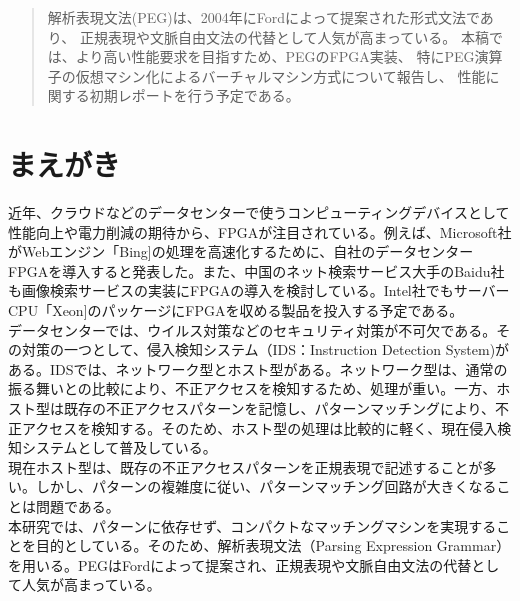\documentclass[paper]{ieicej}
\begin{document}
\begin{abstract}
解析表現文法(PEG)は、2004年にFordによって提案された形式文法であり、
正規表現や文脈自由文法の代替として人気が高まっている。
本稿では、より高い性能要求を目指すため、PEGのFPGA実装、
特にPEG演算子の仮想マシン化によるバーチャルマシン方式について報告し、
性能に関する初期レポートを行う予定である。
\end{abstract}
\begin{keyword}
\end{keyword}
\begin{eabstract}
\end{eabstract}
\begin{ekeyword}
\end{ekeyword}
\maketitle

\section{まえがき}

近年、クラウドなどのデータセンターで使うコンピューティングデバイスとして性能向上や電力削減の期待から、FPGAが注目されている。例えば、Microsoft社がWebエンジン「Bing]の処理を高速化するために、自社のデータセンターFPGAを導入すると発表した。また、中国のネット検索サービス大手のBaidu社も画像検索サービスの実装にFPGAの導入を検討している。Intel社でもサーバーCPU「Xeon]のパッケージにFPGAを収める製品を投入する予定である。\\
データセンターでは、ウイルス対策などのセキュリティ対策が不可欠である。その対策の一つとして、侵入検知システム（IDS：Instruction Detection System)がある。IDSでは、ネットワーク型とホスト型がある。ネットワーク型は、通常の振る舞いとの比較により、不正アクセスを検知するため、処理が重い。一方、ホスト型は既存の不正アクセスパターンを記憶し、パターンマッチングにより、不正アクセスを検知する。そのため、ホスト型の処理は比較的に軽く、現在侵入検知システムとして普及している。\\
現在ホスト型は、既存の不正アクセスパターンを正規表現で記述することが多い。しかし、パターンの複雑度に従い、パターンマッチング回路が大きくなることは問題である。\\
本研究では、パターンに依存せず、コンパクトなマッチングマシンを実現することを目的としている。そのため、解析表現文法（Parsing Expression Grammar）を用いる。PEGはFordによって提案され、正規表現や文脈自由文法の代替として人気が高まっている。
\end{document}
